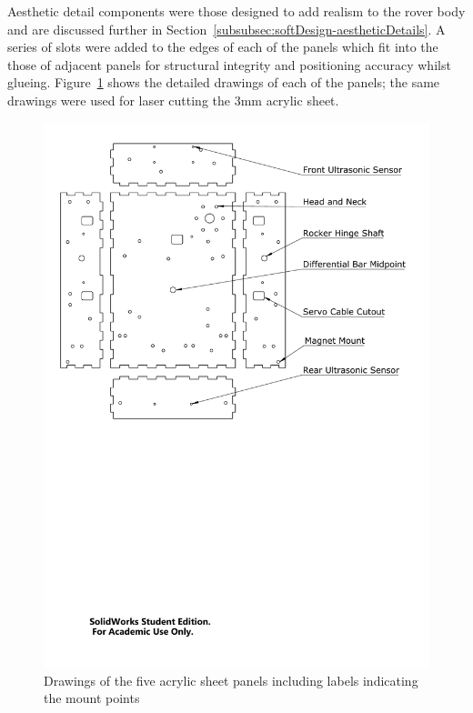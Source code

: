       Aesthetic detail components were those designed to add realism to the rover body and are discussed further in Section~\ref{subsubsec:softDesign-aestheticDetails}. A series of slots were added to the edges of each of the panels which fit into the those of adjacent panels for structural integrity and positioning accuracy whilst glueing. Figure~\ref{fig:mechDesign-perspex} shows the detailed drawings of each of the panels; the same drawings were used for laser cutting the 3mm acrylic sheet.
      
      \begin{figure}[h!]
        \centering
        \includegraphics[clip, trim=0cm 13cm 1cm 0cm, width=1\linewidth]{figures/perspex}
        \caption[Drawings of the five acrylic sheet panels including labels indicating the mount points]{Drawings of the five acrylic sheet panels including labels indicating the mount points}
        \label{fig:mechDesign-perspex}
      \end{figure}
      
